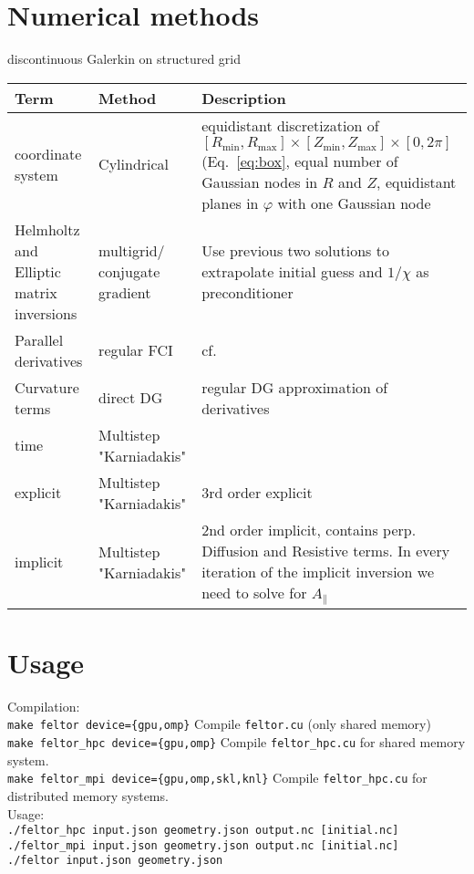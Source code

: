 \section{Numerical methods}
discontinuous Galerkin on structured grid
\begin{longtable}{p{3cm}l>{\RaggedRight}p{8cm}}
\toprule
\rowcolor{gray!50}\textbf{Term} &  \textbf{Method} & \textbf{Description}  \\ \midrule
    coordinate system & Cylindrical & equidistant discretization of $[R_{\min},R_{\max}] \times [Z_{\min},Z_{\max}] \times [0,2\pi]$ (Eq.~\eqref{eq:box}, equal number of Gaussian nodes in $R$ and $Z$, equidistant planes in $\varphi$ with one Gaussian node \\
Helmholtz and Elliptic matrix inversions & multigrid/ conjugate gradient & Use previous two solutions to extrapolate initial guess and $1/\chi$ as preconditioner \\
Parallel derivatives & regular  FCI & cf.~\cite{Held2016,Stegmeir2017} \\
Curvature terms & direct DG & regular DG approximation of derivatives \\
time & Multistep "Karniadakis" & \\
\qquad explicit & Multistep "Karniadakis" & $3$rd order explicit\\
\qquad implicit & Multistep "Karniadakis" & $2$nd order implicit, contains perp. Diffusion and Resistive terms. In every iteration of the implicit inversion we need to solve for $A_\parallel$\\
\bottomrule
\end{longtable}

\section{Usage}
Compilation:\\
\texttt{make feltor device=\{gpu,omp\}} Compile \texttt{feltor.cu} (only shared memory)\\
\texttt{make feltor\_hpc device=\{gpu,omp\}} Compile \texttt{feltor\_hpc.cu} for shared memory system.\\
\texttt{make feltor\_mpi device=\{gpu,omp,skl,knl\}} Compile \texttt{feltor\_hpc.cu} for distributed memory systems.\\
Usage:\\
\texttt{./feltor\_hpc input.json geometry.json output.nc [initial.nc]} \\
\texttt{./feltor\_mpi input.json geometry.json output.nc [initial.nc]} \\
\texttt{./feltor input.json geometry.json } \\

